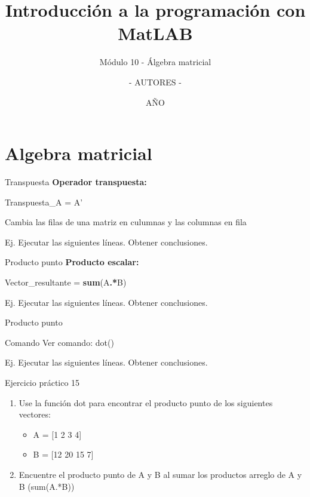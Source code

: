 \documentclass{bredelebeamer}
\title[Programación en MatLAB]{Introducción a la programación con MatLAB}
\subtitle{Módulo 10 - Álgebra matricial}
\author{- AUTORES - \inst{1}}
\institute[UNIVERSIDAD]
{
  \inst{1}%
  - NOMBRE UNIVERSIDAD - 
  }
\date{AÑO}
\begin{document}
\begin{frame}
  \titlepage 
\end{frame}



\section{Algebra matricial}

\begin{frame}{Transpuesta}
\textbf{Operador transpuesta:} 
\begin{center}
Transpuesta\_A = A'
\end{center}
\begin{center}
Cambia las filas de una matriz en culumnas y las columnas en fila
\end{center}
Ej. Ejecutar las siguientes líneas. Obtener conclusiones.

\end{frame}

\begin{frame}{Producto punto}
\textbf{Producto escalar:}
\begin{center}
Vector\_resultante = \textbf{sum}(A\textbf{.*}B)
\end{center}
Ej. Ejecutar las siguientes líneas. Obtener conclusiones.

\end{frame}

\begin{frame}{Producto punto}
\begin{exampleblock}{Comando}
Ver comando: dot()
\end{exampleblock}
Ej. Ejecutar las siguientes líneas. Obtener conclusiones.

\end{frame}

\begin{frame}{Ejercicio práctico 15}
\begin{enumerate}
\item Use la función dot para encontrar el producto punto de los siguientes vectores:
\begin{itemize}
\item A = [1 2 3 4]
\item B = [12 20 15 7]
\end{itemize}
\item Encuentre el producto punto de A y B al sumar los productos arreglo de A y B (sum(A.*B))
\end{enumerate}
\end{frame}
\end{document}
